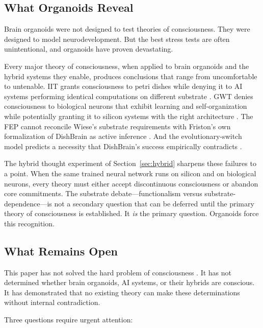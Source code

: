 
\subsection{What Organoids Reveal}

Brain organoids were not designed to test theories of consciousness. They were
designed to model neurodevelopment. But the best stress tests are often unintentional,
and organoids have proven devastating.

Every major theory of consciousness, when applied to brain organoids and the hybrid
systems they enable, produces conclusions that range from uncomfortable to untenable.
IIT grants consciousness to petri dishes while denying it to AI systems performing
identical computations on different substrate \cite{tononi2025intrinsic, shin2025iit}.
GWT denies consciousness to biological neurons that exhibit learning and
self-organization while potentially granting it to silicon systems with the right
architecture \cite{goldstein2024case, kagan2022dishbrain}. The FEP cannot reconcile
Wiese's substrate requirements \cite{wiese2024fep} with Friston's own formalization
of DishBrain as active inference \cite{friston2025active}. And the evolutionary-switch
model predicts a necessity that DishBrain's success empirically contradicts
\cite{sritriratanarak2025consciousness, kagan2022dishbrain}.

The hybrid thought experiment of Section~\ref{sec:hybrid} sharpens these failures to
a point. When the same trained neural network runs on silicon and on biological
neurons, every theory must either accept discontinuous consciousness or abandon core
commitments. The substrate debate---functionalism versus substrate-dependence---is not
a secondary question that can be deferred until the primary theory of consciousness
is established. It \emph{is} the primary question. Organoids force this recognition.

\subsection{What Remains Open}

This paper has not solved the hard problem of consciousness \cite{chalmers1995facing}.
It has not determined whether brain organoids, AI systems, or their hybrids are
conscious. It has demonstrated that no existing theory can make these determinations
without internal contradiction.

Three questions require urgent attention:

